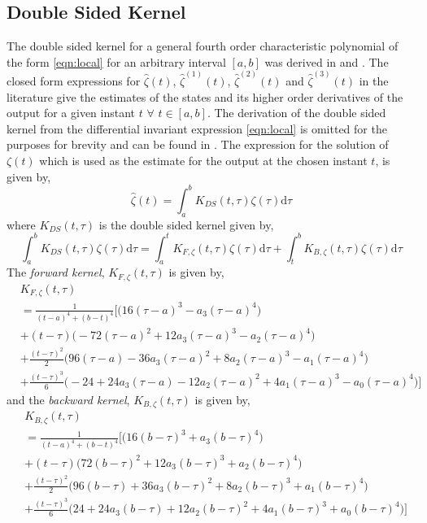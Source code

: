 \documentclass[letterpaper%
, twoside%
, 12pt%
,memoire%
, english%
,creativecommons,hyperref%
]{thETS}
\begin{document}
\subsection{Double Sided Kernel \citep{RN120}}
The double sided kernel for a general fourth order characteristic polynomial of the form \eqref{eqn:local} for an arbitrary interval $[a,b]$ was derived in \citep{RN83} and \citep{RN120}. The closed form expressions for $\hat{\zeta}(t)$, $\hat{\zeta}^{(1)}(t)$, $\hat{\zeta}^{(2)}(t)$ and $\hat{\zeta}^{(3)}(t)$ in the literature give the estimates of the states and its higher order derivatives of the output for a given instant $t$ $\forall$ $t \in [a,b]$. The derivation of the double sided kernel from the differential invariant expression \eqref{eqn:local} is omitted for the purposes for brevity and can be found in \citep{RN120}. The expression for the solution of $\zeta(t)$ which is used as the estimate for the output at the chosen instant $t$, is given by, 
\begin{equation}\label{eqn:y_estimate}
\hat{\zeta}(t) = \int_{a}^{b} K_{DS}(t,\tau)\zeta(\tau)\mathrm{d}\tau
\end{equation} where $K_{DS}(t,\tau)$ is the double sided kernel given by, 
\begin{equation}\label{eqn:KDS_split}
\int_{a}^{b} K_{DS}(t,\tau)\zeta(\tau)\mathrm{d}\tau = \int_{a}^{t}K_{F,\zeta}(t,\tau)\zeta(\tau)\mathrm{d}\tau + \int_{t}^{b}K_{B,\zeta}(t,\tau)\zeta(\tau)\mathrm{d}\tau 
\end{equation}
The \textit{forward kernel}, $K_{F,\zeta}(t,\tau)$ is given by,
\begin{equation}\label{eqn:forward}
\begin{split}
	& K_{F,\zeta}(t,\tau)\\
	&= \frac{1}{(t-a)^4+(b-t)^4}\bigg[\Big(16(\tau-a)^{3}-a_3(\tau-a)^{4}\Big)\\
	&+(t-\tau)\Big(-72(\tau-a)^2 + 12a_3(\tau-a)^3 - a_2(\tau-a)^4\Big)\\
	&+\frac{(t-\tau)^2}{2}\Big(96(\tau-a) - 36a_3(\tau-a)^2 + 8a_2(\tau-a)^3 -a_1(\tau-a)^4\Big)\\
	&+\frac{(t-\tau)^3}{6}\Big(-24 + 24a_3(\tau-a) - 12a_2(\tau-a)^2 + 4a_1(\tau-a)^3 - a_0(\tau-a)^4\Big)\bigg]	
\end{split}
\end{equation}
and the \textit{backward kernel}, $K_{B,\zeta}(t,\tau)$ is given by,
\begin{equation}\label{eqn:backward}
\begin{split}
	&K_{B,\zeta}(t,\tau)\\
	&=\frac{1}{(t-a)^4+(b-t)^4}\bigg[\Big(16(b-\tau)^{3} + a_3(b-\tau)^{4}\Big)\\
	&+(t-\tau)\Big(72(b-\tau)^{2} + 12a_3(b-\tau)^{3} + a_2(b-\tau)^{4}\Big)\\
	&+\frac{(t-\tau)^{2}}{2}\Big(96(b-\tau)+36a_3(b-\tau)^{2} + 8a_2(b-\tau)^{3} + a_1(b-\tau)^{4}\Big)\\
	&+\frac{(t-\tau)^{3}}{6}\Big(24+24a_3(b-\tau)+12a_2(b-\tau)^{2}+4a_1(b-\tau)^{3}+a_0(b-\tau)^{4}\Big)\bigg]
\end{split}
\end{equation}
\end{document}

